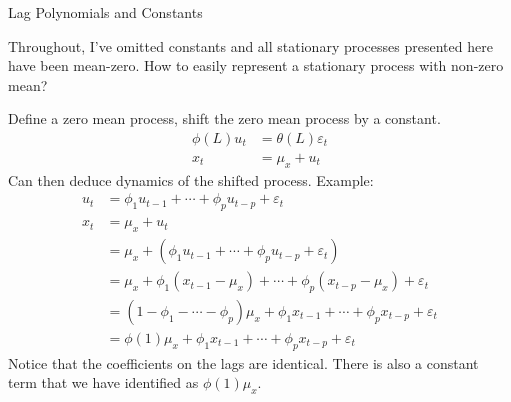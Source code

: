 \documentclass[aspectratio=169, handout]{beamer}
\begin{document}
{\scriptsize
\begin{frame}{Lag Polynomials and Constants}

Throughout, I've omitted constants and all stationary processes
presented here have been mean-zero.
How to easily represent a stationary process with non-zero
mean?

Define a zero mean process, shift the zero mean process by a constant.
\begin{align*}
  \phi(L)u_t &=
  \theta(L)\varepsilon_t
  \\
  x_t
  &= \mu_x + u_t
\end{align*}
Can then deduce dynamics of the shifted process.
Example:
\begin{align*}
  u_t
  &=
  \phi_1 u_{t-1}
  +
  \cdots
  +
  \phi_p u_{t-p}
  + \varepsilon_t
  \\
  x_t
  &= \mu_x + u_t
  \\
  &= \mu_x
  +
  \left(
  \phi_1 u_{t-1}
  +
  \cdots
  +
  \phi_p u_{t-p}
  + \varepsilon_t
  \right)
  \\
  &=
  \mu_x
  +
  \phi_1 (x_{t-1}-\mu_x)
  +
  \cdots
  +
  \phi_p (x_{t-p}-\mu_x)
  + \varepsilon_t
  \\
  &=
  (1-\phi_1-\cdots-\phi_p)\mu_x
  + \phi_1 x_{t-1}
  + \cdots
  + \phi_p x_{t-p}
  + \varepsilon_t
  \\
  &=
  \phi(1)\mu_x
  + \phi_1 x_{t-1}
  + \cdots
  + \phi_p x_{t-p}
  + \varepsilon_t
\end{align*}
Notice that the coefficients on the lags are \alert{identical}.
There is also a constant term that we have identified as $\phi(1)\mu_x$.
\end{frame}
}
\end{document}

